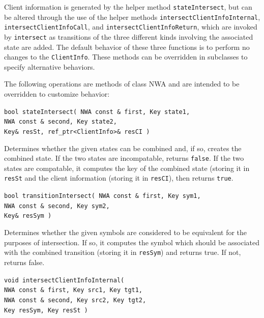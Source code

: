 Client information is generated by the helper method \texttt{stateIntersect},
but can be altered through the use of the helper methods
\texttt{intersectClientInfoInternal}, \texttt{intersectClientInfoCall}, and
\texttt{intersect\-Client\-InfoReturn}, which are invoked by
\texttt{intersect} as transitions of the three different kinds involving the
associated state are added.  The default behavior of these three functions is
to perform no changes to the \texttt{ClientInfo}.  These methods can be
overridden in subclasses to specify alternative behaviors.

\goodbreak
\noindent The following operations are methods of class NWA and are intended
to be overridden to customize behavior:

\begin{description}

  \item\texttt{bool stateIntersect( NWA const \& first, Key state1,\\ 
                   \hspace*{3.25cm} NWA const \& second, Key state2,\\
                   \hspace*{3.25cm} Key\& resSt, ref\_ptr<ClientInfo>\& resCI )}
    \nopagebreak

    Determines whether the given states can be combined and,
    if so, creates the combined state. If the two states are incompatable,
    returns \texttt{false}. If the two states are compatable, it computes the
    key of the combined state (storing it in \texttt{resSt} and the client
    information (storing it in \texttt{resCI}), then returns \texttt{true}.

  \item\texttt{bool transitionIntersect( NWA const \& first, Key
    sym1,\\ \hspace*{3.25cm} NWA const \& second, Key
    sym2,\\ \hspace*{3.25cm} Key\& resSym )} \nopagebreak

    Determines whether the given symbols are considered to be equivalent for
    the purposes of intersection. If so, it computes the symbol which should
    be associated with the combined transition (storing it in
    \texttt{resSym}) and returns true. If not, returns false.

  \item\texttt{void intersectClientInfoInternal( \\ \hspace*{3.25cm}
    NWA const \& first, Key src1, Key tgt1,\\ \hspace*{3.25cm} NWA const \&
    second, Key src2, Key tgt2,\\ \hspace*{3.25cm} Key resSym, Key resSt )}
    \nopagebreak


\end{description}

